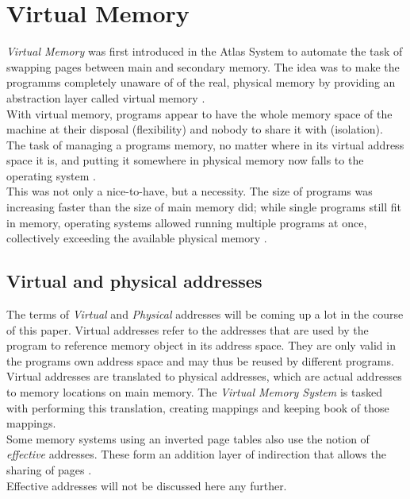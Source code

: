 \section{Virtual Memory}
\textit{Virtual Memory} was first introduced in the Atlas System \cite{fotheringham1961dynamic} to
automate the task of swapping pages between main and secondary memory.
The idea was to make the programms completely unaware of of the real, physical memory by providing
an abstraction layer called virtual memory \cite{denning1996virtual}.\\
With virtual memory, programs appear to have the whole memory space of the machine at their disposal (flexibility) and
nobody to share it with (isolation).\\
The task of managing a programs memory, no matter where in its virtual address space it is, and putting it somewhere
in physical memory now falls to the operating system \cite{denning1970virtual}.\\
This was not only a nice-to-have, but a necessity. The size of programs was increasing faster than the size of main
memory did; while single programs
still fit in memory, operating systems allowed running multiple programs at once, collectively exceeding
the available physical memory \cite{tanenbaumOS}.

\subsection{Virtual and physical addresses}
The terms of \textit{Virtual} and \textit{Physical} addresses will be coming up a lot in the course of this paper.
Virtual addresses refer to the addresses that are used by the program to reference memory object in its address
space. They are only valid in the programs own address space and may thus be reused by different programs.
Virtual addresses are translated to physical addresses, which are actual addresses to memory locations
on main memory. The \textit{Virtual Memory System} is tasked with performing this translation, creating mappings
and keeping book of those mappings.
\\
Some memory systems using an inverted page tables also use the notion of \textit{effective} addresses.
These form an addition layer of indirection that allows the sharing of pages \cite{jacob1998virtualissues}.\\
Effective addresses will not be discussed here any further.

